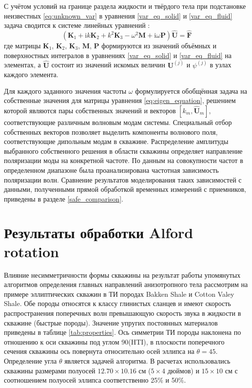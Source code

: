 \documentclass[a4paper,11pt]{article}
\newcommand{\ii}{\mathrm{i}}
\begin{document}
С учётом условий на границе раздела жидкости и твёрдого тела при подстановке неизвестных \eqref{eq:unknown_var} в уравнения \eqref{var_eq_solid} и \eqref{var_eq_fluid} задача сводится к системе линейных уравнений \cite{Bartoli2006,Treyssede2013}:
\begin{equation}
(\mathbf{K}_1 + \ii k \mathbf{K}_2 + k^2 \mathbf{K}_3 - \omega^2 \mathbf{M} + \ii \omega \mathbf{P}) \hat{\mathbf{U}} = \hat{\mathbf{F}} \label{eq:eigen_equation}
\end{equation}
где матрицы $\mathbf{K}_1$, $\mathbf{K}_2$, $\mathbf{K}_3$, $\mathbf{M}$, $\mathbf{P}$ формируются из значений объёмных и поверхностных интегралов в уравнениях \eqref{var_eq_solid} и \eqref{var_eq_fluid} на элементах, а $ \hat{\mathbf{U}}$ состоит из значений искомых величин $\mathbf{U}^{(j)}$ и $\psi^{(j)}$ в узлах каждого элемента. 

Для каждого заданного значения частоты $\omega$ формулируется обобщённая задача на собственные значения для матрицы уравнения \eqref{eq:eigen_equation}, решением которой являются пары собственных значений и векторов $[k_m, \hat{\mathbf{U}}_m]$, соответствующие различным волновым модам системы. Специальный отбор собственных векторов позволяет выделить компоненты волнового поля, соответствующие дипольным модам в скважине. Распределение амплитуды выбранного собственного решения в области скважины определяет направление поляризации моды на конкретной частоте. По данным на совокупности частот в определенном диапазоне была проанализирована частотная зависимость поляризации волн. Сравнение результатов моделирования таких зависимостей с данными, полученными прямой обработкой временных измерений с приемников, приведены в разделе \ref{safe_comparison}.

\section{Результаты обработки Alford rotation}
\label{comparison_alford}
Влияние несимметричности формы скважины на результат работы упомянутых алгоритмов определения главных направлений анизотропного тела рассмотрим на примере эллиптических скважин в ТИ породах  Bakken Shale и Cotton Valey Shale. Обе породы относятся к классу глинистых сланцев и имеют скорость распространения поперечных волн превышающую скорость звука в жидкости в скважине (быстрые породы). Значение упругих постоянных материалов приведены в таблице \ref{tab:properties}. Ось симметрии ТИ породы наклонена по отношению к оси скважины под углом 90\textdegree (HTI), в плоскости поперечного сечения скважины ось повернута относительно осей эллипса на $\theta = 45$\textdegree. Определение угла $\theta$ является задачей алгоритма. В расчетах использовались скважины размерами полуосей $12.70 \times 10.16$ см ($5 \times 4$ дюймов) и $15 \times 10$ см с соотношением полуосей эллипса соответственно 25\% и 50\%. 
\end{document}

